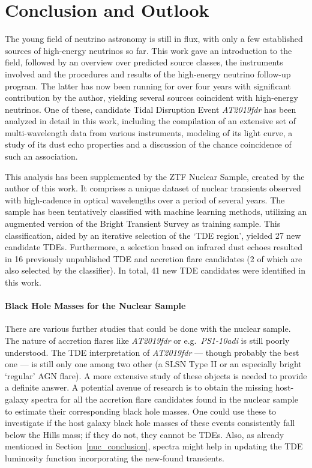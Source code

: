 \chapter*{Conclusion and Outlook}\label{conclusion}
The young field of neutrino astronomy is still in flux, with only a few established sources of high-energy neutrinos so far. This work gave an introduction to the field, followed by an overview over predicted source classes, the instruments involved and the procedures and results of the high-energy neutrino follow-up program. The latter has now been running for over four years with significant contribution by the author, yielding several sources coincident with high-energy neutrinos. One of these, candidate Tidal Disruption Event \textit{AT2019fdr} has been analyzed in detail in this work, including the compilation of an extensive set of multi-wavelength data from various instruments, modeling of its light curve, a study of its dust echo properties and a discussion of the chance coincidence of such an association.

This analysis has been supplemented by the ZTF Nuclear Sample, created by the author of this work. It comprises a unique dataset of nuclear transients observed with high-cadence in optical wavelengths over a period of several years. The sample has been tentatively classified with machine learning methods, utilizing an augmented version of the Bright Transient Survey as training sample. This classification, aided by an iterative selection of the `TDE region', yielded 27 new candidate TDEs. Furthermore, a selection based on infrared dust echoes resulted in 16 previously unpublished TDE and accretion flare candidates (2 of which are also selected by the classifier). In total, 41 new TDE candidates were identified in this work.

\subsubsection{Black Hole Masses for the Nuclear Sample}
There are various further studies that could be done with the nuclear sample. The nature of accretion flares like \textit{AT2019fdr} or e.g.~\textit{PS1-10adi} is still poorly understood. The TDE interpretation of \textit{AT2019fdr} --- though probably the best one ---  is still only one among two other (a SLSN Type II or an especially bright `regular' AGN flare). A more extensive study of these objects is needed to provide a definite answer. A potential avenue of research is to obtain the missing host-galaxy spectra for all the accretion flare candidates found in the nuclear sample to estimate their corresponding black hole masses. One could use these to investigate if the host galaxy black hole masses of these events consistently fall below the Hills mass; if they do not, they cannot be TDEs. Also, as already mentioned in Section~\ref{nuc_conclusion}, spectra might help in updating the TDE luminosity function incorporating the new-found transients.

